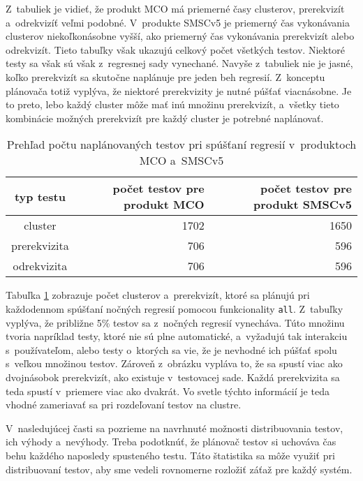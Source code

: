 Z~tabuliek je vidieť, že produkt MCO má priemerné časy clusterov, prerekvizít a~odrekvizíť veľmi podobné.
V~produkte SMSCv5 je priemerný čas vykonávania clusterov niekoľkonásobne vyšší, ako priemerný čas vykonávania prerekvizít alebo odrekvizít.
Tieto tabuľky však ukazujú celkový počet všetkých testov. Niektoré testy sa však sú však z~regresnej sady vynechané.
Navyše z~tabuliek nie je jasné, koľko prerekvizít sa skutočne naplánuje pre jeden beh regresií.
Z~konceptu plánovača totiž vyplýva, že niektoré prerekvizity je nutné púšťať viacnásobne.
Je to preto, lebo každý cluster môže mať inú množinu prerekvizít, a~všetky tieto kombinácie možných prerekvizít pre každý cluster
je potrebné naplánovať.

\begin{table}
  \begin{center}
    \begin{tabular}{| c | r | r |}
    \hline
    typ testu  & počet testov pre produkt MCO & počet testov pre produkt SMSCv5 \\ \hline
    cluster      & 1702 & 1650 \\ \hline
    prerekvizita & 706  & 596  \\ \hline
    odrekvizita  & 706  & 596 \\
    \hline
    \end{tabular}
    \caption{Prehľad počtu naplánovaných testov pri spúšťaní regresií v~produktoch MCO a~SMSCv5}
    \label{tabulka:pocet_naplanovanych_testov}
  \end{center}
\end{table}

Tabuľka \ref{tabulka:pocet_naplanovanych_testov} zobrazuje počet clusterov a~prerekvizít, ktoré sa plánujú
pri každodennom spúšťaní nočných regresií pomocou funkcionality \texttt{all}. Z~tabuľky vyplýva, že približne 5\% testov sa 
z~nočných regresií vynecháva. Túto množinu tvoria napríklad testy, ktoré nie sú plne automatické, a~vyžadujú tak interakciu s~používateľom,
alebo testy o~ktorých sa vie, že je nevhodné ich púšťať spolu s~veľkou množinou testov.
Zároveň z~obrázku vypláva to, že sa spustí viac ako dvojnásobok prerekvizít, ako existuje v~testovacej sade.
Každá prerekvizita sa teda spustí v~priemere viac ako dvakrát. 
Vo svetle týchto informácií je teda vhodné zameriavať sa pri rozdeľovaní testov na clustre.

V~nasledujúcej časti sa pozrieme na navrhnuté možnosti distribuovania testov, ich výhody a~nevýhody.
Treba podotknúť, že plánovač testov si uchováva čas behu každého naposledy spusteného testu.
Táto štatistika sa môže využiť pri distribuovaní testov, aby sme vedeli rovnomerne rozložiť záťaž pre každý systém.
